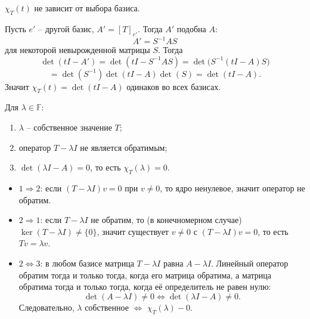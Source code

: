 \documentclass[14pt]{extreport}
\begin{document}
    \begin{thbox}
        $\chi_T(t)$ не зависит от выбора базиса.
    \end{thbox}
    \begin{prbox}
        Пусть $e'$ – другой базис, $A' = [T]_{e'}$. Тогда $A'$ подобна $A$:
        \[
        A' = S^{-1}AS
        \]
        для некоторой невырожденной матрицы $S$. Тогда
        \[
        \det(tI-A') = \det(tI-S^{-1}AS) = \det \bigl(S^{-1}(tI-A)S\bigr) 
        \]
        \vspace{-1.2cm}
        \[
        = \det(S^{-1}) \det(tI-A) \det(S) = \det(tI-A).
        \]
        Значит $\chi_T(t) = \det(tI-A)$ одинаков во всех базисах.
    \end{prbox}

    \begin{thbox}
        Для $\lambda \in \mathbb{F}$:
        \begin{enumerate}
            \item $\lambda$ – собственное значение $T$;
            \item оператор $T - \lambda I$ не является обратимым;
            \item $\det(\lambda I - A) = 0$, то есть $\chi_T(\lambda) = 0$.
        \end{enumerate}
    \end{thbox}

    \begin{prbox}
        \begin{itemize}
            \item $1 \Rightarrow 2$: если $(T - \lambda I)v = 0$ при $v \neq 0$, то ядро ненулевое, значит оператор не обратим.
            \item $2 \Rightarrow 1$: если $T - \lambda I$ не обратим, то (в конечномерном случае) $\ker(T - \lambda I) \neq \{0\}$, значит существует $v \neq 0$ с $(T - \lambda I)v = 0$, то есть $Tv = \lambda v$.
            \item $2 \Leftrightarrow 3$: в любом базисе матрица $T - \lambda I$ равна $A - \lambda I$. Линейный оператор обратим тогда и только тогда, когда его матрица обратима, а матрица обратима тогда и только тогда, когда её определитель не равен нулю:
            \[
            \det(A - \lambda I) \neq 0 \Leftrightarrow \det(\lambda I - A) \neq 0.
            \]
            Следовательно, $\lambda$ собственное $\Leftrightarrow$ $\chi_T(\lambda) - 0$.
        \end{itemize}
    \end{prbox}
\end{document}
